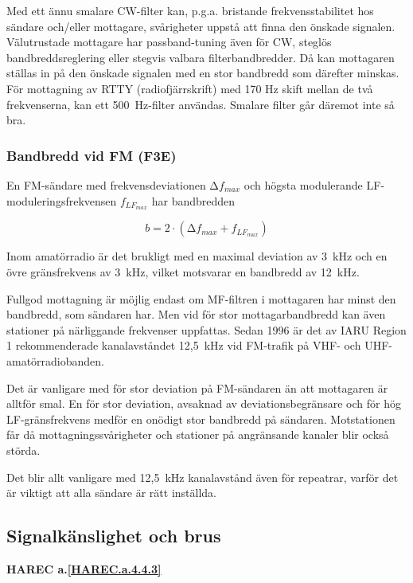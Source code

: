 Med ett ännu smalare CW-filter kan, p.g.a. bristande
frekvensstabilitet hos sändare och/eller mottagare, svårigheter
uppstå att finna den önskade signalen. Välutrustade mottagare har
passband-tuning även för CW, steglös bandbreddsreglering eller stegvis
valbara filterbandbredder. Då kan mottagaren ställas in på den önskade
signalen med en stor bandbredd som därefter minskas.  För mottagning
av RTTY (radiofjärrskrift) med 170 Hz skift mellan de två
frekvenserna, kan ett 500~Hz-filter användas. Smalare filter går
däremot inte så bra.

\subsubsection{Bandbredd vid FM (F3E)}

En FM-sändare med frekvensdeviationen \(∆f_{max}\) och högsta
modulerande LF-moduleringsfrekvensen \(f_{LF_{max}}\) har bandbredden

\[ b = 2 \cdot (∆f_{max} + f_{LF_{max}}) \]

Inom amatörradio är det brukligt med en maximal deviation av 3~kHz och
en övre gränsfrekvens av 3~kHz, vilket motsvarar en bandbredd av 12~kHz.

Fullgod mottagning är möjlig endast om MF-filtren i mottagaren har
minst den bandbredd, som sändaren har. Men vid för stor
mottagarbandbredd kan även stationer på närliggande frekvenser
uppfattas. Sedan 1996 är det av IARU Region 1 rekommenderade
kanalavståndet 12,5~kHz vid FM-trafik på VHF- och
UHF-amatörradiobanden.

Det är vanligare med för stor deviation på FM-sändaren än att
mottagaren är alltför smal. En för stor deviation, avsaknad av
deviationsbegränsare och för hög LF-gränsfrekvens medför en onödigt
stor bandbredd på sändaren. Motstationen får då mottagningssvårigheter
och stationer på angränsande kanaler blir också störda.

Det blir allt vanligare med 12,5~kHz kanalavstånd även för repeatrar,
varför det är viktigt att alla sändare är rätt inställda.

\subsection{Signalkänslighet och brus}
\textbf{HAREC a.\ref{HAREC.a.4.4.3}\label{myHAREC.a.4.4.3}}

